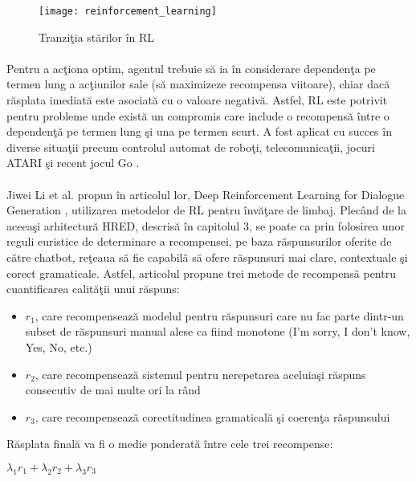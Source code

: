 \begin{figure}[H]
\centering
\texttt{[image: reinforcement\_learning]}
\caption{Tranzi\c tia st\u arilor \^ in RL}
\end{figure}

\paragraph{}
Pentru a ac\c tiona optim, agentul trebuie s\u a ia \^ in considerare dependen\c ta pe termen lung a ac\c tiunilor sale (s\u a maximizeze recompensa viitoare), chiar dac\u a r\u asplata imediat\u a este asociat\u a cu o valoare negativ\u a. Astfel, RL este potrivit pentru probleme unde exist\u a un compromis care include o recompens\u a \^ intre o dependen\c t\u a pe termen lung \c si una pe termen scurt. A fost aplicat cu succes \^ in diverse situa\c tii precum controlul automat de robo\c ti, telecomunica\c tii, jocuri ATARI \c si recent jocul Go \cite{silver2016mastering}.

\paragraph{}
Jiwei Li et al. propun \^ in articolul lor, Deep Reinforcement Learning for Dialogue Generation \cite{DBLP:journals/corr/LiMRGGJ16}, utilizarea metodelor de RL pentru \^ inv\u a\c tare de limbaj. Plec\^ and de la aceea\c si arhitectur\u a HRED, descris\u a \^ in capitolul 3, se poate ca prin folosirea unor reguli euristice de determinare a recompensei, pe baza r\u aspunsurilor oferite de c\u atre chatbot, re\c teaua s\u a fie capabil\u a s\u a ofere r\u aspunsuri mai clare, contextuale \c si corect gramaticale. Astfel, articolul propune trei metode de recompens\u a pentru cuantificarea calit\u a\c tii unui r\u aspuns:

\begin{itemize}
	\item \(r_1\), care recompenseaz\u a modelul pentru r\u aspunsuri care nu fac parte dintr-un subset de r\u aspunsuri manual alese ca fiind monotone (I'm sorry, I don't know, Yes, No, etc.)
	\item \(r_2\), care recompenseaz\u a sistemul pentru nerepetarea aceluia\c si r\u aspuns consecutiv de mai multe ori la r\^ and
	\item \(r_3\), care recompenseaz\u a corectitudinea gramatical\u a \c si coeren\c ta r\u aspunsului
\end{itemize}


R\u asplata final\u a va fi o medie ponderat\u a \^ intre cele trei recompense:
\begin{center}
\(\lambda_1 r_1 + \lambda_2 r_2 + \lambda_3 r_3\)
\end{center}

